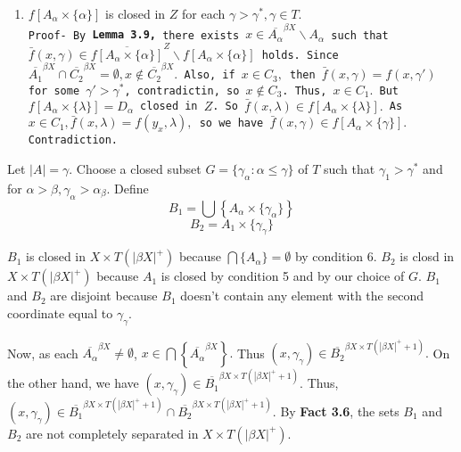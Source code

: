\documentclass{article}
\begin{document}
\begin{enumerate}
\vskip 20pt
	
	
	\item $f\left[A_\alpha\times\{\alpha\}\right]$ is closed in $Z$ for each $\gamma>\gamma^*, \gamma\in T$.\\
	\texttt{Proof- By \textbf{Lemma 3.9,} there exists $x\in \overline{A_\alpha}^{\beta X}\backslash A_\alpha$ such that $\bar{f}(x,\gamma)\in \overline{f\left[A_\alpha\times\{\alpha\}\right]}^Z \backslash f\left[A_\alpha\times \{\alpha\}\right]$ holds. Since $\overline{A_1}^{\beta X} \cap \overline{C_2}^{\beta X}=\emptyset, x\notin \overline{C_2}^{\beta X}.$ Also, if $x\in C_3,$ then $\bar{f}(x,\gamma)=f(x,\gamma')$ for some $\gamma'>\gamma^*$, contradictin, so $x\notin C_3$. Thus, $x\in C_1.$ But $f\left[A_\alpha\times\{\lambda\}\right]=D_\alpha$ closed in $Z$. So $\bar{f}(x,\lambda)\in f\left[A_\alpha \times \{\lambda\}\right].$ As $x\in C_1, \bar{f}(x,\lambda)=f(y_x,\lambda),$ so we have $\bar{f}(x,\gamma)\in f\left[A_\alpha\times\{\gamma\}\right].$ Contradiction.}
	
\end{enumerate}



\vskip 20pt


Let $|A|=\gamma$. Choose a closed subset $G=\{\gamma_\alpha: \alpha\leq \gamma\}$ of $T$ such that $\gamma_1>\gamma^*$ and for $\alpha>\beta, \gamma_\alpha>\alpha_\beta$. Define 
$$B_1=\bigcup \left\{A_\alpha\times \{\gamma_\alpha\}\right\}$$
$$B_2=A_1\times \{\gamma_{\gamma}\}$$

$B_1$ is closed in $X\times T(|\beta X|^+)$ because $\bigcap \{A_\alpha\}=\emptyset$ by condition 6. $B_2$ is closd in $X\times T(|\beta X|^+)$ because $A_1$ is closed by condition 5 and by our choice of $G$. $B_1$ and $B_2$ are disjoint because $B_1$ doesn't contain any element with the second coordinate equal to $\gamma_\gamma$.

\vskip 15pt

Now, as each $\overline{A_\alpha}^{\beta X} \neq \emptyset$, $x\in \bigcap \left\{\overline{A_\alpha}^{\beta X}\right\}.$ Thus $(x,\gamma_\gamma)\in \overline{B_2}^{\beta X \times T(|\beta X|^+ +1)}.$ On the other hand, we have $(x, \gamma_\gamma)\in \overline{B_1}^{\beta X \times T(|\beta X|^+ +1)}$. Thus, $(x,\gamma_\gamma)\in \overline{B_1}^{\beta X\times T(|\beta X|^+ +1)} \cap \overline{B_2}^{\beta X\times T(|\beta X|^+ +1)}.$ By \textbf{Fact 3.6}, the sets $B_1$ and $B_2$ are not completely separated in $X\times T(|\beta X|^+).$

\vskip 15pt
\end{document}
